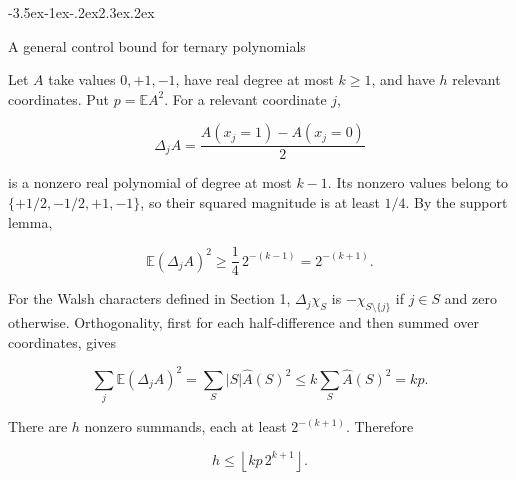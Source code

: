 \documentclass[11pt]{article}
\makeatletter
\renewcommand\section{\@startsection{section}{1}{\z@}
  {-3.5ex\@plus -1ex\@minus -.2ex}{2.3ex\@plus .2ex}
  {\normalfont\Large\bfseries\raggedright}}
\theoremstyle{remark}
\theoremstyle{correctionstyle}
\makeatother
\begin{document}
\section{A general control bound for ternary polynomials}\label{src-p017}\label{src-end-p017}

\leavevmode\label{src-p018}Let $A$ take values $0,+1,-1$, have real degree at most $k\ge 1$, and have $h$
relevant coordinates. Put $p=\mathbb E A^2$. For a relevant coordinate $j$,\label{src-end-p018}\par

\begin{equation}
\Delta_jA=\frac{A(x_j{=}1)-A(x_j{=}0)}{2}\tag*{}
\label{src-p019}
\end{equation}

\leavevmode\label{src-p020}is a nonzero real polynomial of degree at most $k-1$. Its nonzero values
belong to $\{+1/2,\allowbreak-1/2,\allowbreak+1,\allowbreak-1\}$, so their squared magnitude is at least $1/4$.
By the support lemma,\label{src-end-p020}\par

\begin{equation}
\mathbb E(\Delta_jA)^2\ge\frac{1}{4}\,2^{-(k-1)}=2^{-(k+1)}.\tag*{}
\label{src-p021}
\end{equation}

\leavevmode\label{src-p022}For the Walsh characters defined in Section 1, $\Delta_j\chi_S$ is
$-\chi_{S\setminus\{j\}}$ if $j\in S$ and zero otherwise. Orthogonality,
first for each half-difference and then summed over coordinates, gives\label{src-end-p022}\par

\begin{equation}
\sum_j\mathbb E(\Delta_jA)^2=\sum_S|S|\widehat A(S)^2\le k\sum_S\widehat A(S)^2=kp.\tag*{}
\label{src-p023}
\end{equation}

\leavevmode\label{src-p024}There are $h$ nonzero summands, each at least $2^{-(k+1)}$. Therefore\label{src-end-p024}\par

\begin{equation}
h\le\left\lfloor kp\,2^{k+1}\right\rfloor.\tag{1}
\label{src-p025}
\end{equation}
\end{document}
